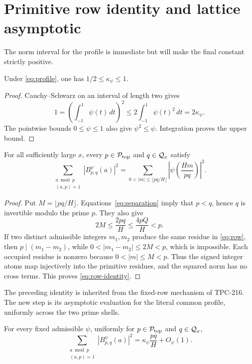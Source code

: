 \section{Primitive row identity and lattice asymptotic}
\label{sec:rows}

The norm interval for the profile is immediate but will make the final
constant strictly positive.

\begin{lemma}
\label{lem:kappa}
Under \eqref{eq:profile}, one has $1/2\leq\kappa_\psi\leq1$.
\end{lemma}

\begin{proof}
Cauchy--Schwarz on an interval of length two gives
\[
 1=\left(\int_{-1}^{1}\psi(t)\,dt\right)^2
 \leq2\int_{-1}^{1}\psi(t)^2\,dt=2\kappa_\psi.
\]
The pointwise bounds $0\leq\psi\leq1$ also give
$\psi^2\leq\psi$.  Integration proves the upper bound.
\end{proof}

\begin{lemma}
\label{lem:row}
For all sufficiently large $x$, every $p\in\mathcal{P}_{\mathrm{top}}$ and $q\in\mathcal{Q}_x$
satisfy
\begin{equation}
 \sum_{\substack{a\bmod p\\(a,p)=1}}|B_{p,q}^{\psi}(a)|^2
 =\sum_{0<|m|\leq\lfloor pq/H\rfloor}
 \left|\psi\!\left(\frac{Hm}{pq}\right)\right|^2.
 \label{eq:row-identity}
\end{equation}
\end{lemma}

\begin{proof}
Put $M=\lfloor pq/H\rfloor$.  Equations~\eqref{eq:separation} imply that
$p<q$, hence $q$ is invertible modulo the prime $p$.  They also give
\[
 2M\leq\frac{2pq}{H}\leq\frac{4pQ}{H}<p.
\]
If two distinct admissible integers $m_1,m_2$ produce the same residue in
\eqref{eq:row}, then $p\mid(m_1-m_2)$, while
$0<|m_1-m_2|\leq2M<p$, which is impossible.  Each occupied residue is
nonzero because $0<|m|\leq M<p$.  Thus the signed integer atoms map
injectively into the primitive residues, and the squared norm has no cross
terms.  This proves \eqref{eq:row-identity}.
\end{proof}

The preceding identity is inherited from the fixed-row mechanism of
TPC-216.  The new step is its asymptotic evaluation for the literal common
profile, uniformly across the two prime shells.

\begin{lemma}
\label{lem:riemann}
For every fixed admissible $\psi$, uniformly for
$p\in\mathcal{P}_{\mathrm{top}}$ and $q\in\mathcal{Q}_x$,
\begin{equation}
 \sum_{\substack{a\bmod p\\(a,p)=1}}|B_{p,q}^{\psi}(a)|^2
 =\kappa_\psi\frac{pq}{H}+O_\psi(1).
 \label{eq:row-asymptotic}
\end{equation}
\end{lemma}

